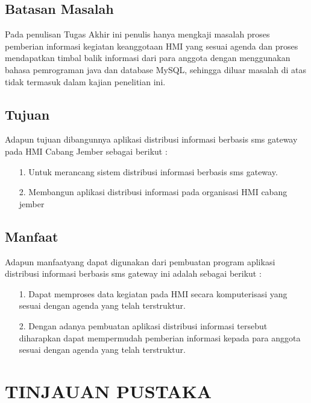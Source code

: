 \documentclass{jtetiproposalskripsi}
\begin{document}
\section{Batasan Masalah}
Pada penulisan Tugas Akhir ini penulis hanya mengkaji masalah proses pemberian informasi kegiatan keanggotaan HMI yang sesuai agenda dan proses mendapatkan timbal balik informasi dari para anggota dengan menggunakan bahasa pemrograman java dan database MySQL, sehingga diluar masalah di atas tidak termasuk dalam kajian penelitian ini.

\section{Tujuan}
Adapun tujuan dibangunnya aplikasi distribusi informasi berbasis sms gateway pada HMI Cabang Jember sebagai berikut :
\begin{itemize}

\item[1.]	Untuk  merancang sistem distribusi informasi berbasis sms gateway.
\item[2.]	Membangun aplikasi distribusi informasi pada organisasi HMI cabang jember
\end{itemize}



\section{Manfaat}
Adapun manfaatyang dapat digunakan dari pembuatan program aplikasi distribusi informasi berbasis sms gateway ini adalah sebagai berikut :
\begin{itemize}

\item[1.]	Dapat memproses data kegiatan pada HMI secara komputerisasi yang sesuai dengan agenda yang telah terstruktur.
\item[2.]	Dengan adanya pembuatan aplikasi distribusi informasi tersebut diharapkan dapat mempermudah pemberian informasi kepada para anggota sesuai dengan agenda yang telah terstruktur.
\end{itemize}


\chapter{TINJAUAN PUSTAKA}                
\end{document}
